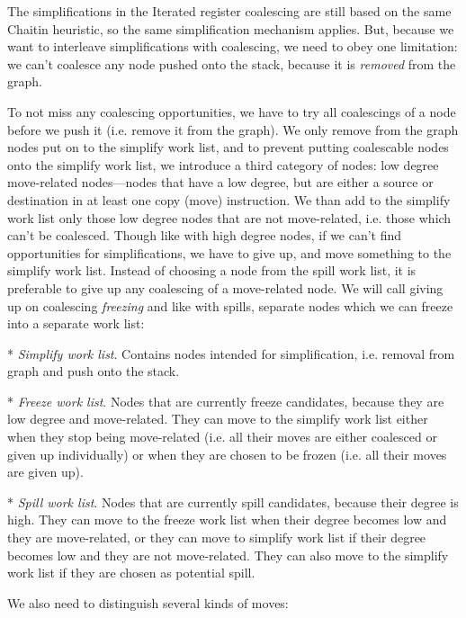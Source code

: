 The simplifications in the Iterated register coalescing are still based on the
same Chaitin heuristic, so the same simplification mechanism applies. But,
because we want to interleave simplifications with coalescing, we need to obey
one limitation: we can't coalesce any node pushed onto the stack, because it is
{\em removed} from the graph.


To not miss any coalescing opportunities, we have to try all coalescings of a
node before we push it (i.e. remove it from the graph). We only remove from the
graph nodes put on to the simplify work list, and to prevent putting coalescable
nodes onto the simplify work list, we introduce a third category of nodes: low
degree move-related nodes---nodes that have a low degree, but are either a source
or destination in at least one copy (move) instruction. We than add to the simplify
work list only those low degree nodes that are not move-related, i.e. those
which can't be
coalesced. Though like with high degree nodes, if we can't find opportunities
for simplifications, we have to give up, and move something to the simplify work
list. Instead of choosing a node from the spill work list, it is preferable to
give up any coalescing of a move-related node. We will call giving up on
coalescing {\em freezing} and like with spills, separate nodes which we can
freeze into a separate work list:

\begitems
* {\em Simplify work list}. Contains nodes intended for simplification, i.e. removal
from graph and push onto the stack.

* {\em Freeze work list}. Nodes that are currently freeze candidates, because
they are low degree and move-related. They can move to the simplify work list either when they
stop being move-related (i.e. all their moves are either coalesced or given up
individually) or when they are chosen to be frozen (i.e. all their moves are
given up).

* {\em Spill work list}. Nodes that are currently spill candidates, because their
degree is high. They can move to the freeze work list when their degree becomes
low and they are move-related, or they can move to simplify work list if their
degree becomes low and they are not move-related. They can also move to the
simplify work list if they are chosen as potential spill.
\enditems

We also need to distinguish several kinds of moves:

\begitems

